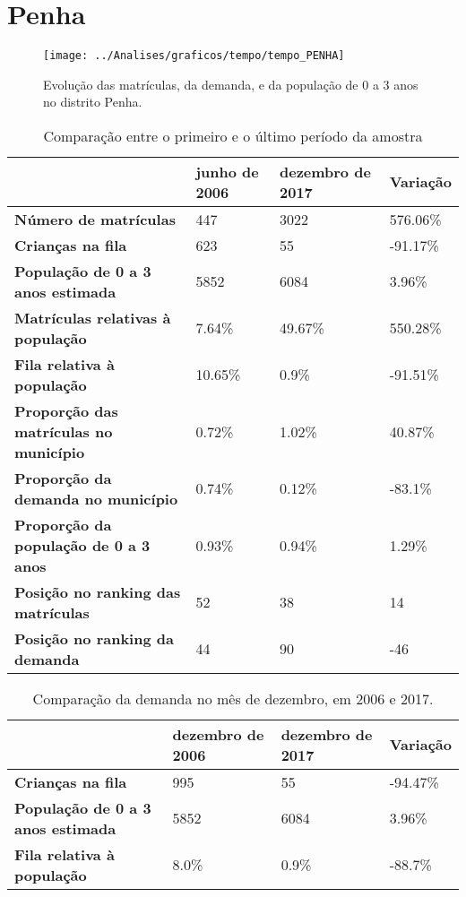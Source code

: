 \section{Penha}
\begin{figure}[H]
\centering
\texttt{[image: ../Analises/graficos/tempo/tempo\_PENHA]}
\caption{Evolução das matrículas, da demanda, e da população de 0 a 3 anos no distrito Penha.}
\end{figure}
\begin{table}[H]
\begin{tabular}{|l|l|l|l|}
\hline
\textbf{}                                      & \textbf{junho de 2006}       & \textbf{dezembro de 2017}    & \textbf{Variação} \\ \hline
\textbf{Número de matrículas}                  & 447 & 3022 & 576.06\% \\ \hline
\textbf{Crianças na fila}                      & 623 & 55 & -91.17\% \\ \hline
\textbf{População de 0 a 3 anos estimada}      & 5852 & 6084 & 3.96\% \\ \hline
\textbf{Matrículas relativas à população}      & 7.64\% & 49.67\% & 550.28\% \\ \hline
\textbf{Fila relativa à população}             & 10.65\% & 0.9\% & -91.51\% \\ \hline
\textbf{Proporção das matrículas no município} & 0.72\% & 1.02\% & 40.87\% \\ \hline
\textbf{Proporção da demanda no município}     & 0.74\% & 0.12\% & -83.1\% \\ \hline
\textbf{Proporção da população de 0 a 3 anos}  & 0.93\% & 0.94\% & 1.29\% \\ \hline
\textbf{Posição no ranking das matrículas}     & 52 & 38 & 14 \\ \hline
\textbf{Posição no ranking da demanda}         & 44 & 90 & -46 \\ \hline
\end{tabular}
\caption{Comparação entre o primeiro e o último período da amostra}
\end{table}
\begin{table}[H]
\begin{tabular}{|l|l|l|l|}
\hline
\textbf{}                                 & \textbf{dezembro de 2006} & \textbf{dezembro de 2017} & \textbf{Variação} \\ \hline
\textbf{Crianças na fila}                      & 995 & 55 & -94.47\% \\ \hline
\textbf{População de 0 a 3 anos estimada}      & 5852 & 6084 & 3.96\% \\ \hline
\textbf{Fila relativa à população}             & 8.0\% & 0.9\% & -88.7\% \\ \hline
\end{tabular}
\caption{Comparação da demanda no mês de dezembro, em 2006 e 2017.}
\end{table}
